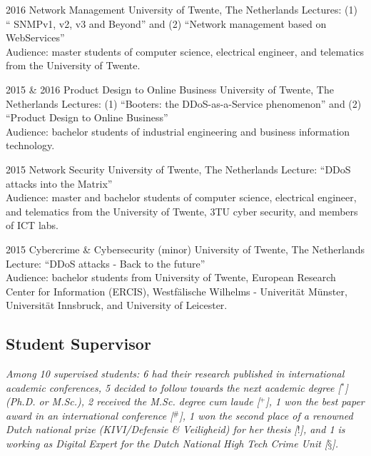 \documentclass[print]{styles/friggeri-cv-mac} %
\begin{document}
\begin{entrylist}
\entry
{2016}
{Network Management}
{University of Twente, The Netherlands}
{Lectures: (1) `` SNMPv1, v2, v3 and Beyond'' and (2) ``Network management based
	on WebServices''\\
Audience: master students of computer science, electrical engineer, and
telematics from the University of Twente. }

\entry
{2015 \& 2016}
{Product Design to Online Business}
{University of Twente, The Netherlands}
{Lectures: (1) ``Booters: the DDoS-as-a-Service phenomenon'' and (2) ``Product
Design to Online Business''\\ Audience: bachelor students of industrial
engineering and business information technology.}

\entry
{2015}
{Network Security}
{University of Twente, The Netherlands}
{Lecture: ``DDoS attacks into the Matrix''\\
Audience: master and bachelor students of computer science, electrical engineer,
and telematics from the University of Twente, 3TU cyber security, and members of
ICT labs. }

\entry
{2015}
{Cybercrime \& Cybersecurity (minor)}
{University of Twente, The Netherlands}
{Lecture: ``DDoS attacks - Back to the future''\\ 
Audience: bachelor students from University of Twente, European Research Center
for Information (ERCIS), Westfälische Wilhelms - Univerität Münster, Universität
Innsbruck, and University of Leicester. } \end{entrylist}

\subsection{Student Supervisor}\vspace{-5pt}

\textit{Among 10 supervised students: 6 had their research published in
international academic conferences, 5 decided to follow towards the next
academic degree [$^*$] (Ph.D. or M.Sc.), 2 received the M.Sc. degree
\textit{cum laude} [$^+$], 1 won the best paper award in an international
conference [$^\#$], 1 won the second place of a renowned Dutch national
prize (KIVI/Defensie \& Veiligheid) for her thesis [$!$], and 1 is working as Digital Expert for the Dutch National High Tech Crime Unit [$§$].}
\end{document}
